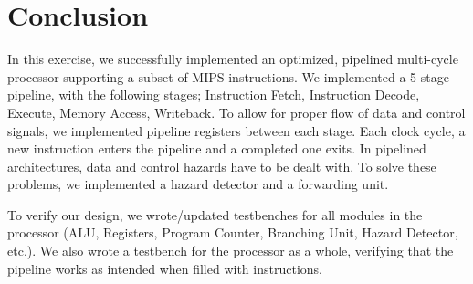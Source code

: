 \chapter{Conclusion}

In this exercise, we successfully implemented an optimized, pipelined multi-cycle processor supporting a subset of MIPS instructions.
We implemented a 5-stage pipeline, with the following stages; Instruction Fetch, Instruction Decode, Execute, Memory Access, Writeback.
To allow for proper flow of data and control signals, we implemented pipeline registers between each stage.
Each clock cycle, a new instruction enters the pipeline and a completed one exits.
In pipelined architectures, data and control hazards have to be dealt with.
To solve these problems, we implemented a hazard detector and a forwarding unit.

To verify our design, we wrote/updated testbenches for all modules in the processor (ALU, Registers, Program Counter, Branching Unit, Hazard Detector, etc.).
We also wrote a testbench for the processor as a whole, verifying that the pipeline works as intended when filled with instructions.
